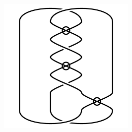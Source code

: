\begin{figure}[H]
\begin{minipage}[b]{.18\linewidth}
\end{minipage}
\begin{minipage}[b]{.18\linewidth}
\centering
\includegraphics[width=\linewidth]{../data/virtual_4_26.png}
\end{minipage}
\end{figure}

